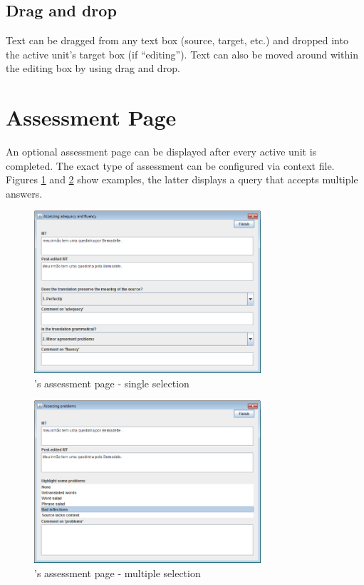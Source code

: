 \subsection{Drag and drop}\label{sec:dragdrop}

Text can be dragged from any text box (source, target, etc.) and dropped into the active unit's target box (if ``editing'').
Text can also be moved around within the editing box by using drag and drop.

\section{Assessment Page}

An optional assessment page can be displayed after every active unit is completed.
The exact type of assessment can be configured via context file.
Figures \ref{fig:assessment} and \ref{fig:assessment-multiple} show examples, the latter displays a query that accepts multiple answers.

\begin{figure}[h]\label{fig:assessment}
\center
\includegraphics[width=0.75\textwidth]{img/assessment-page}
\caption{\PET's assessment page - single selection}
\end{figure}

\begin{figure}[h]\label{fig:assessment-multiple}
\center
\includegraphics[width=0.75\textwidth]{img/assessment-page2}
\caption{\PET's assessment page - multiple selection}
\end{figure}

